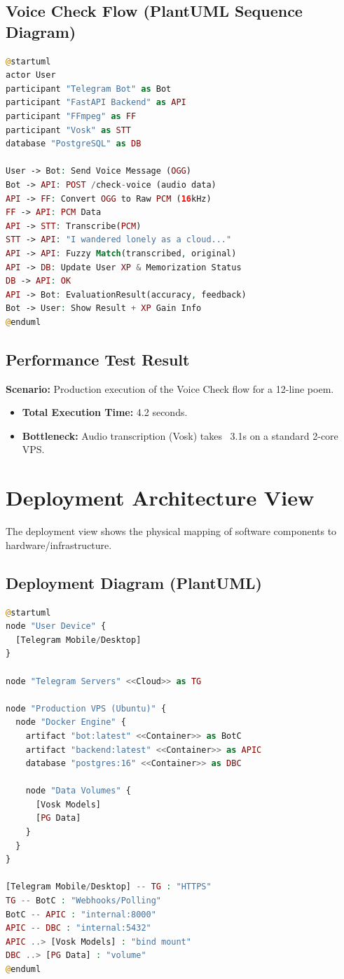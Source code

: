 \documentclass[12pt]{article}
\begin{document}
\subsection{Voice Check Flow (PlantUML Sequence Diagram)}
\begin{lstlisting}[language=PHP, caption=Voice Recitation Check Flow]
@startuml
actor User
participant "Telegram Bot" as Bot
participant "FastAPI Backend" as API
participant "FFmpeg" as FF
participant "Vosk" as STT
database "PostgreSQL" as DB

User -> Bot: Send Voice Message (OGG)
Bot -> API: POST /check-voice (audio data)
API -> FF: Convert OGG to Raw PCM (16kHz)
FF -> API: PCM Data
API -> STT: Transcribe(PCM)
STT -> API: "I wandered lonely as a cloud..."
API -> API: Fuzzy Match(transcribed, original)
API -> DB: Update User XP & Memorization Status
DB -> API: OK
API -> Bot: EvaluationResult(accuracy, feedback)
Bot -> User: Show Result + XP Gain Info
@enduml
\end{lstlisting}

\subsection{Performance Test Result}
\textbf{Scenario:} Production execution of the Voice Check flow for a 12-line poem.
\begin{itemize}
    \item \textbf{Total Execution Time:} 4.2 seconds.
    \item \textbf{Bottleneck:} Audio transcription (Vosk) takes ~3.1s on a standard 2-core VPS.
\end{itemize}

\section{Deployment Architecture View}

The deployment view shows the physical mapping of software components to hardware/infrastructure.

\subsection{Deployment Diagram (PlantUML)}
\begin{lstlisting}[language=PHP, caption=System Deployment Diagram]
@startuml
node "User Device" {
  [Telegram Mobile/Desktop]
}

node "Telegram Servers" <<Cloud>> as TG

node "Production VPS (Ubuntu)" {
  node "Docker Engine" {
    artifact "bot:latest" <<Container>> as BotC
    artifact "backend:latest" <<Container>> as APIC
    database "postgres:16" <<Container>> as DBC
    
    node "Data Volumes" {
      [Vosk Models]
      [PG Data]
    }
  }
}

[Telegram Mobile/Desktop] -- TG : "HTTPS"
TG -- BotC : "Webhooks/Polling"
BotC -- APIC : "internal:8000"
APIC -- DBC : "internal:5432"
APIC ..> [Vosk Models] : "bind mount"
DBC ..> [PG Data] : "volume"
@enduml
\end{lstlisting}
\end{document}
